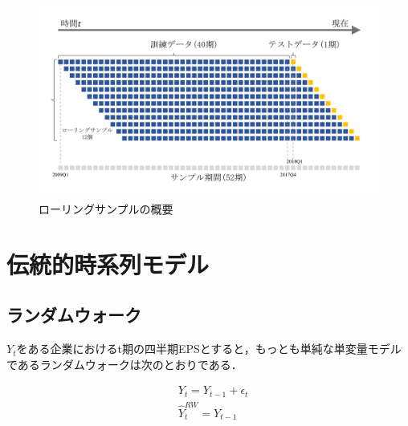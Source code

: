 \documentclass[a4paper，12pt]{jsarticle}
\begin{document}
\begin{figure}[htbp]
  \centering
  \includegraphics[width=15cm]{./img/_rolling_sample.pdf}
  \caption{ローリングサンプルの概要}
  \label{fig:rolling}
\end{figure}

\section{伝統的時系列モデル}

\subsection{ランダムウォーク}

$Y_t$をある企業におけるt期の四半期EPSとすると，もっとも単純な単変量モデルであるランダムウォークは次のとおりである．

\begin{equation}
  \begin{split}
    & Y_t = Y_{t-1} + \epsilon_t \\
    & \hat{Y}_t^{RW} = Y_{t-1} \\
  \end{split}
\end{equation}        

\end{document}
